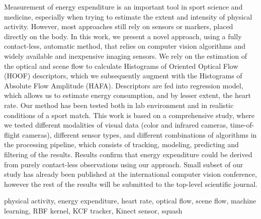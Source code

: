\abstract
Measurement of energy expenditure is an important tool in sport science and medicine, especially when trying to estimate the extent and intensity of physical activity. However, most approaches still rely on sensors or markers, placed directly on the body. In this work, we present a novel approach, using a fully contact-less, automatic method, that relies on computer vision algorithms and widely available and inexpensive imaging sensors. We rely on the estimation of the optical and scene flow to calculate Histograms of Oriented Optical Flow (HOOF) descriptors, which we subsequently augment with the Histograms of Absolute Flow Amplitude (HAFA). Descriptors are fed into regression model, which allows us to estimate energy consumption, and by lesser extent, the heart rate. Our method has been tested both in lab environment and in realistic conditions of a sport match. This work is based on a comprehensive study, where we tested different modalities of visual data (color and infrared cameras, time-of-flight cameras), different sensor types, and different combinations of algorithms in the processing pipeline, which consists of tracking, modeling, predicting and filtering of the results. Results confirm that energy expenditure could be derived from purely contact-less observations using our approach. Small subset of our study has already been published at the international computer vision conference, however the rest of the results will be submitted to the top-level scientific journal.

\keywords physical activity, energy expenditure, heart rate, optical flow, scene flow, machine learning, RBF kernel, KCF tracker, Kinect sensor, squash